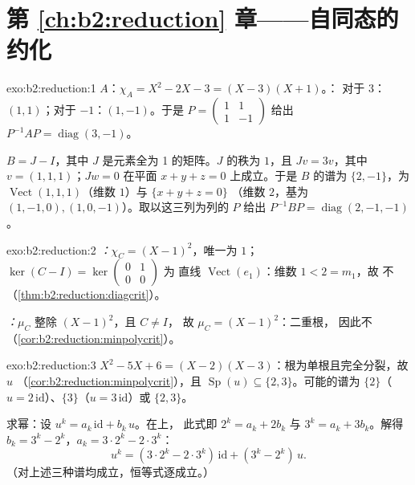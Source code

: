 \section*{第 \ref{ch:b2:reduction} 章——自同态的约化}

\begin{solution}{exo:b2:reduction:1}
$A$：$\chi_A = X^2 - 2X - 3 = (X - 3)(X + 1)$。：
对于 $3$：$(1,1)$；对于 $-1$：$(1,-1)$。于是 $P = \begin{pmatrix} 1 & 1\\ 1
& -1\end{pmatrix}$ 给出 $P^{-1}AP = \operatorname{diag}(3, -1)$。

$B = J - I$，其中 $J$ 是元素全为 1 的矩阵。$J$ 的秩为 $1$，且
$Jv = 3v$，其中 $v = (1,1,1)$；$Jw = 0$ 在平面 $x + y + z =
0$ 上成立。于是 $B$ 的谱为 $\{2, -1\}$，为
$\operatorname{Vect}(1,1,1)$（维数 $1$）与 $\{x + y + z = 0\}$
（维数 $2$，基为 $(1,-1,0), (1,0,-1)$）。取以这三列为列的 $P$
给出 $P^{-1}BP = \operatorname{diag}(2, -1, -1)$。
\end{solution}

\begin{solution}{exo:b2:reduction:2}
\emph{：}$\chi_C = (X-1)^2$，唯一为 $1$；
$\ker(C - I) = \ker\begin{pmatrix} 0&1\\ 0&0\end{pmatrix}$ 为
直线 $\operatorname{Vect}(e_1)$：维数 $1 < 2 = m_1$，故
不（\cref{thm:b2:reduction:diagcrit}）。

\emph{：}$\mu_C$ 整除 $(X-1)^2$，且 $C \neq I$，
故 $\mu_C = (X-1)^2$：二重根，
因此不（\cref{cor:b2:reduction:minpolycrit}）。
\end{solution}

\begin{solution}{exo:b2:reduction:3}
$X^2 - 5X + 6 = (X-2)(X-3)$：根为单根且完全分裂，故 $u$ （\cref{cor:b2:reduction:minpolycrit}），且
$\operatorname{Sp}(u) \subseteq \{2, 3\}$。可能的谱为
$\{2\}$（$u = 2\,\mathrm{id}$）、$\{3\}$（$u = 3\,\mathrm{id}$）或
$\{2, 3\}$。

求幂：设 $u^k = a_k\,\mathrm{id} + b_k\,u$。在上，
此式即 $2^k = a_k + 2b_k$ 与 $3^k = a_k + 3b_k$。解得 $b_k
= 3^k - 2^k$，$a_k = 3\cdot2^k - 2\cdot 3^k$：
\[
u^k = (3\cdot 2^k - 2\cdot 3^k)\,\mathrm{id} + (3^k - 2^k)\, u .
\]
（对上述三种谱均成立，恒等式逐成立。）
\end{solution}

